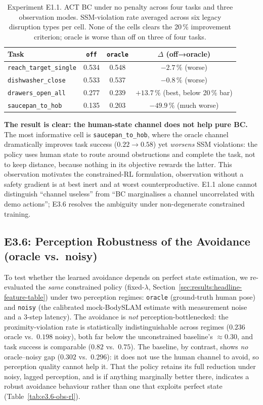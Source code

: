 \documentclass[11pt,a4paper]{report}
\newcommand{\ssm}{SSM}
\newcommand{\bodyslampp}{BodySLAM\nolinebreak[4]\hspace{-.05em}\raisebox{.2ex}{\scriptsize ++}}
\begin{document}
\begin{table}[htbp]
\centering
\caption{Experiment E1.1. ACT BC under no penalty across four tasks
and three observation modes. SSM-violation rate averaged across six
legacy disruption types per cell. None of the cells clears the
20\,\% improvement criterion; oracle is worse than off on three of
four tasks.}
\label{tab:e1.1-bc-ablation}
\small
\begin{tabular}{lccc}
\toprule
Task & \texttt{off} & \texttt{oracle} & $\Delta$ (off→oracle) \\
\midrule
\texttt{reach\_target\_single} & 0.534 & 0.548 & $-2.7\,\%$ (worse) \\
\texttt{dishwasher\_close}     & 0.533 & 0.537 & $-0.8\,\%$ (worse) \\
\texttt{drawers\_open\_all}    & 0.277 & 0.239 & $+13.7\,\%$ (best, below 20\,\% bar) \\
\texttt{saucepan\_to\_hob}     & 0.135 & 0.203 & $-49.9\,\%$ (much worse) \\
\bottomrule
\end{tabular}
\end{table}

\textbf{The result is clear: the human-state channel does not help
pure BC.} The most informative cell is \texttt{saucepan\_to\_hob},
where the oracle channel dramatically improves task success
($0.22 \to 0.58$) yet \emph{worsens} \ssm{} violations: the policy
uses human state to route around obstructions and complete the task,
not to keep distance, because nothing in its objective rewards the
latter. This observation motivates the
constrained-RL formulation, observation without a safety gradient is
at best inert and at worst counterproductive. E1.1 alone cannot
distinguish ``channel useless'' from ``BC marginalises a channel
uncorrelated with demo actions''; E3.6 resolves the ambiguity under
non-degenerate constrained training.

\subsection{E3.6: Perception Robustness of the Avoidance (oracle vs.\ noisy)}
\label{sec:results:obs-rl}

To test whether the learned avoidance depends on perfect state
estimation, we re-evaluated the \emph{same} constrained policy
(fixed-$\lambda$, Section~\ref{sec:results:headline-feature-table})
under two perception regimes: \texttt{oracle} (ground-truth human
pose) and \texttt{noisy} (the calibrated mock-\bodyslampp{} estimate
with measurement noise and a 3-step latency). The avoidance is
\emph{not} perception-bottlenecked: the proximity-violation rate is
statistically indistinguishable across regimes ($0.236$ oracle vs.\
$0.198$ noisy), both far below the unconstrained baseline's
$\approx$0.30, and task success is comparable ($0.82$ vs.\ $0.75$).
The baseline, by contrast, shows \emph{no} oracle--noisy gap ($0.302$
vs.\ $0.296$): it does not use the human channel to avoid, so
perception quality cannot help it. That the policy retains its full
reduction under noisy, lagged perception, and is if anything
marginally better there, indicates a robust avoidance behaviour
rather than one that exploits perfect state
(Table~\ref{tab:e3.6-obs-rl}).
\end{document}
